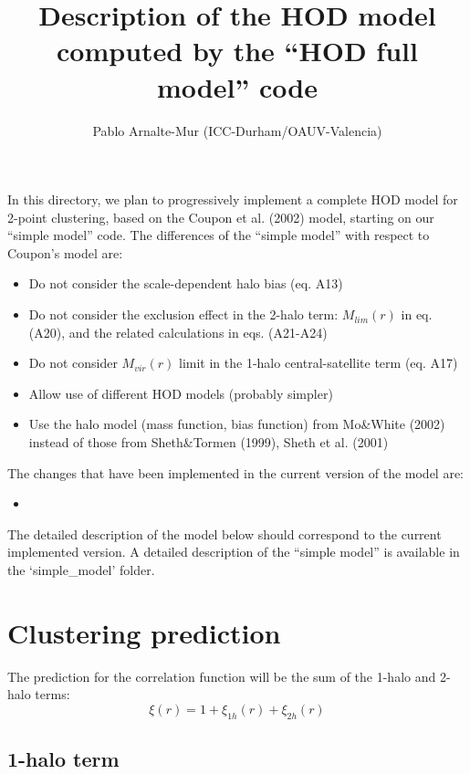 \documentclass[10pt,a4paper]{article}
\title{Description of the HOD model computed by the ``HOD full model'' code}
\author{Pablo Arnalte-Mur (ICC-Durham/OAUV-Valencia)}
\begin{document}
\maketitle

In this directory, we plan to progressively implement a complete HOD model for 2-point clustering, based on the Coupon et al. (2002) model, starting on our ``simple model'' code. 
The differences of the ``simple model'' with respect to Coupon's model are:

\begin{itemize}

\item Do not consider the scale-dependent halo bias (eq. A13)
\item Do not consider the exclusion effect in the 2-halo term: $M_{lim}(r)$ in eq. (A20),
  and the related calculations in eqs. (A21-A24)
\item Do not consider $M_{vir}(r)$ limit in the 1-halo central-satellite term (eq. A17)
\item Allow use of different HOD models (probably simpler)
\item Use the halo model (mass function, bias function) from Mo\&White (2002) instead of those from Sheth\&Tormen (1999), Sheth et al. (2001)
\end{itemize}


The changes that have been implemented in the current version of the model are:
\begin{itemize}
\item 
\end{itemize}


The detailed description of the model below should correspond to the current implemented version. 
A detailed description of the ``simple model'' is available in the `simple\_model' folder.

\section{Clustering prediction}

The prediction for the correlation function will be the sum of the 1-halo and 2-halo terms:
\begin{equation}
\xi(r) = 1 + \xi_{1h}(r) + \xi_{2h}(r)
\end{equation}

\subsection{1-halo term}
\end{document}
